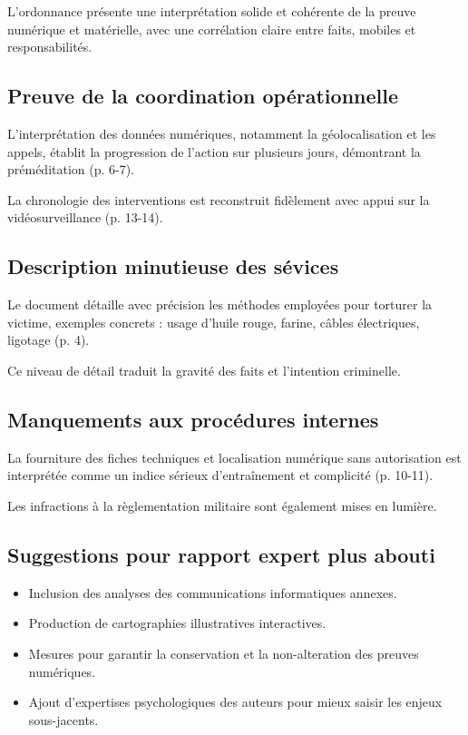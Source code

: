 \documentclass[12pt,a4paper]{article}
\begin{document}
	L'ordonnance présente une interprétation solide et cohérente de la preuve numérique et matérielle, avec une corrélation claire entre faits, mobiles et responsabilités.
	
	\subsection{Preuve de la coordination opérationnelle}
	
	L'interprétation des données numériques, notamment la géolocalisation et les appels, établit la progression de l'action sur plusieurs jours, démontrant la préméditation (p. 6-7).
	
	La chronologie des interventions est reconstruit fidèlement avec appui sur la vidéosurveillance (p. 13-14).
	
	\subsection{Description minutieuse des sévices}
	
	Le document détaille avec précision les méthodes employées pour torturer la victime, exemples concrets : usage d'huile rouge, farine, câbles électriques, ligotage (p. 4).
	
	Ce niveau de détail traduit la gravité des faits et l'intention criminelle.
	
	\subsection{Manquements aux procédures internes}
	
	La fourniture des fiches techniques et localisation numérique sans autorisation est interprétée comme un indice sérieux d'entraînement et complicité (p. 10-11).
	
	Les infractions à la règlementation militaire sont également mises en lumière.
	
	\subsection{Suggestions pour rapport expert plus abouti}
	
	\begin{itemize}[leftmargin=*]
		\item Inclusion des analyses des communications informatiques annexes.
		\item Production de cartographies illustratives interactives.
		\item Mesures pour garantir la conservation et la non-alteration des preuves numériques.
		\item Ajout d'expertises psychologiques des auteurs pour mieux saisir les enjeux sous-jacents.
	\end{itemize}
	
\end{document}
